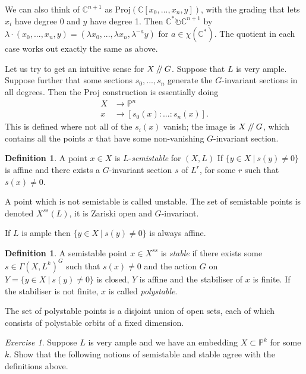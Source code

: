 \documentclass{article}
\theoremstyle{definition}
\newtheorem{definition}[theorem]{Definition}
\theoremstyle{remark}
\newtheorem{exercise}[theorem]{Exercise}
\numberwithin{theorem}{section}
\newcommand{\C}{\mathbb{C}}
\newcommand{\bP}{\mathbb{P}}
\newcommand{\sslash}{\mathbin{/\mkern-4mu/}}
\newcommand{\Proj}{\text{Proj}}
\newenvironment{defn}{
	\begin{mdframed}
		\vspace{-0.5em}
		\begin{definition}
		}{
		\end{definition}
	\end{mdframed}
}
\begin{document}
	We can also think of $\C^{n+1}$ as $\Proj\left(\C[x_0,...,x_n,y]\right)$, with the grading that lets $x_i$ have degree 0 and $y$ have degree 1. Then $\C^\ast \circlearrowright \C^{n+1}$ by $\lambda\cdot (x_0,...,x_n,y) = (\lambda x_0,...,\lambda x_n, \lambda^{-a}y)$ for $a\in \chi(\C^\ast)$. The quotient in each case works out exactly the same as above. \vspace{1em}
	
	Let us try to get an intuitive sense for $X\sslash G$. Suppose that $L$ is very ample. Suppose further that some sections $s_0,...,s_n$ generate the $G$-invariant sections in all degrees. Then the Proj construction is essentially doing
	\begin{align*}
		X &\to \bP^n\\
		x&\to [s_0(x):...:s_n(x)].
	\end{align*}
	This is defined where not all of the $s_i(x)$ vanish; the image is $X\sslash G$, which contains all the points $x$ that have some non-vanishing $G$-invariant section.
	
	\begin{defn}
		A point $x\in X$ is $L$-\emph{semistable} for $(X,L)$ If $\{y\in X ~|~ s(y)\neq 0\}$ is affine and there exists a $G$-invariant section $s$ of $L^r$, for some $r$ such that $s(x)\neq0$. \vspace{1em}
		
		A point which is not semistable is called unstable. The set of semistable points is denoted $X^{ss}(L)$, it is Zariski open and $G$-invariant.
	\end{defn}
	If $L$ is ample then $\{y\in X ~|~ s(y)\neq 0\}$ is always affine.
	
	\begin{defn}
		A semistable point $x\in X^{ss}$ is \emph{stable} if there exists some $s\in\Gamma(X,L^k)^G$ such that $s(x)\neq 0$ and the action $G$ on $Y=\{y\in X ~|~ s(y)\neq 0\}$ is closed, $Y$ is affine and the stabiliser of $x$ is finite. If the stabiliser is not finite, $x$ is called \emph{polystable}.
	\end{defn}
	
	The set of polystable points is a disjoint union of open sets, each of which consists of polystable orbits of a fixed dimension. \vspace{1em}
	
	\begin{exercise}
		Suppose $L$ is very ample and we have an embedding $X\subset \bP^k$ for some $k$. Show that the following notions of semistable and stable agree with the definitions above.
	\end{exercise}
\end{document}
